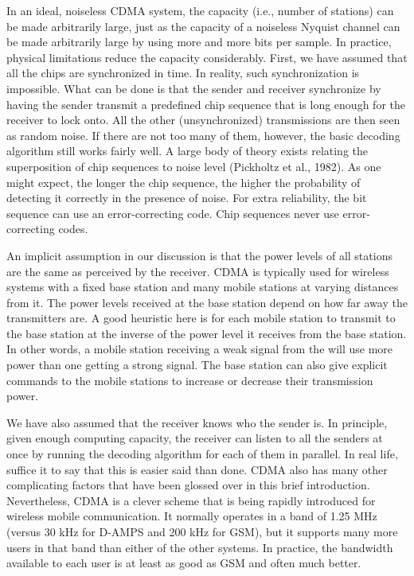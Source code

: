 In an ideal, noiseless CDMA system, the capacity (i.e., number of
stations) can be made arbitrarily large, just as the capacity of a
noiseless Nyquist channel can be made arbitrarily large by using more
and more bits per sample. In practice, physical limitations reduce the
capacity considerably. First, we have assumed that all the chips are
synchronized in time. In reality, such synchronization is impossible.
What can be done is that the sender and receiver synchronize by having
the sender transmit a predefined chip sequence that is long enough for
the receiver to lock onto. All the other (unsynchronized) transmissions
are then seen as random noise. If there are not too many of them,
however, the basic decoding algorithm still works fairly well. A large
body of theory exists relating the superposition of chip sequences to
noise level (Pickholtz et al., 1982). As one might expect, the longer
the chip sequence, the higher the probability of detecting it correctly
in the presence of noise. For extra reliability, the bit sequence can
use an error-correcting code. Chip sequences never use error-correcting
codes.

An implicit assumption in our discussion is that the power levels of all
stations are the same as perceived by the receiver. CDMA is typically
used for wireless systems with a fixed base station and many mobile
stations at varying distances from it. The power levels received at the
base station depend on how far away the transmitters are. A good
heuristic here is for each mobile station to transmit to the base
station at the inverse of the power level it receives from the base
station. In other words, a mobile station receiving a weak signal from
the will use more power than one getting a strong signal. The base
station can also give explicit commands to the mobile stations to
increase or decrease their transmission power.

We have also assumed that the receiver knows who the sender is. In
principle, given enough computing capacity, the receiver can listen to
all the senders at once by running the decoding algorithm for each of
them in parallel. In real life, suffice it to say that this is easier
said than done. CDMA also has many other complicating factors that have
been glossed over in this brief introduction. Nevertheless, CDMA is a
clever scheme that is being rapidly introduced for wireless mobile
communication. It normally operates in a band of 1.25 MHz (versus 30 kHz
for D-AMPS and 200 kHz for GSM), but it supports many more users in that
band than either of the other systems. In practice, the bandwidth
available to each user is at least as good as GSM and often much better.

